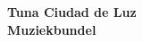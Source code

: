 \begin{titlepage}
\begin{center}
\textbf{\Huge Tuna Ciudad de Luz \\Muziekbundel}
\end{center}
\end{titlepage}
